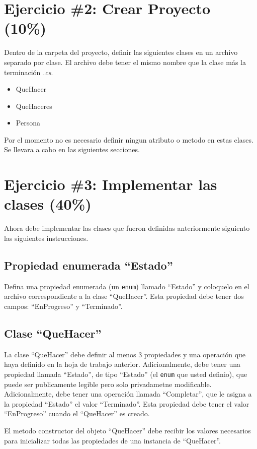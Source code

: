 \documentclass{article}
\begin{document}
\section*{Ejercicio \#2: Crear Proyecto (10\%)}

Dentro de la carpeta del proyecto, definir las siguientes clases en un archivo
separado por clase. El archivo debe tener el mismo nombre que la clase m\'as la
terminaci\'on \emph{.cs}.
\begin{itemize}
        \item{QueHacer}
        \item{QueHaceres}
        \item{Persona}
\end{itemize}
Por el momento no es necesario definir ningun atributo o metodo en estas
clases. Se llevara a cabo en las siguientes secciones.

\section*{Ejercicio \#3: Implementar las clases (40\%)}

Ahora debe implementar las clases que fueron definidas anteriormente
siguiento las siguientes instrucciones.

\subsection*{Propiedad enumerada ``Estado''}

Defina una propiedad enumerada (un \texttt{enum}) llamado ``Estado'' y coloquelo
en el archivo correspondiente a la clase ``QueHacer''. Esta propiedad debe tener
dos campos: ``EnProgreso'' y ``Terminado''.

\subsection*{Clase ``QueHacer''}
La clase ``QueHacer'' debe definir al menos 3 propiedades y una operaci\'on que
haya definido en la hoja de trabajo anterior. Adicionalmente, debe tener una propiedad llamada
``Estado'', de tipo ``Estado'' (el \texttt{enum} que usted definio), que puede ser publicamente
legible pero solo privadametne modificable. Adicionalmente, debe tener una operaci\'on llamada ``Completar'', que
le asigna a la propiedad ``Estado'' el valor ``Terminado''. Esta propiedad debe
tener el valor ``EnProgreso'' cuando el ``QueHacer'' es creado.

El metodo constructor del objeto ``QueHacer'' debe recibir los valores necesarios
para inicializar todas las propiedades de una instancia de ``QueHacer''.
\end{document}
